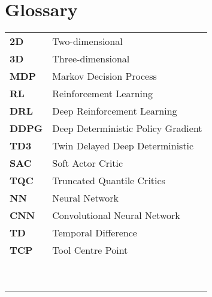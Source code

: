 %
\chapter*{Glossary}

\capstartfalse
\begin{table}[!hb]
    \begin{tabular}{ll}
        \textbf{2D}   & Two-dimensional                    \\
        \textbf{3D}   & Three-dimensional                  \\
        \textbf{MDP}  & Markov Decision Process            \\
        \textbf{RL}   & Reinforcement Learning             \\
        \textbf{DRL}  & Deep Reinforcement Learning        \\
        \textbf{DDPG} & Deep Deterministic Policy Gradient \\
        \textbf{TD3}  & Twin Delayed Deep Deterministic    \\
        \textbf{SAC}  & Soft Actor Critic                  \\
        \textbf{TQC}  & Truncated Quantile Critics         \\
        \textbf{NN}   & Neural Network                     \\
        \textbf{CNN}  & Convolutional Neural Network       \\
        \textbf{TD}   & Temporal Difference                \\
        \textbf{TCP}  & Tool Centre Point                  \\
        \textbf{}     &                                    \\
        \textbf{}     &                                    \\
        \textbf{}     &                                    \\
        \textbf{}     &                                    \\
        \textbf{}     &                                    \\
        \textbf{}     &                                    \\
        \textbf{}     &                                    \\
        \textbf{}     &                                    \\
        \textbf{}     &                                    \\

\end{tabular}
\end{table}
